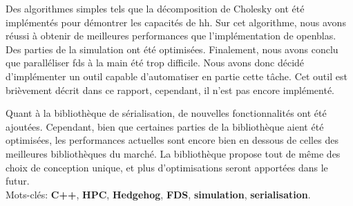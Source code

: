 Des algorithmes simples tels que la décomposition de Cholesky ont été
implémentés pour démontrer les capacités de \gls{hh}. Sur cet algorithme, nous
avons réussi à obtenir de meilleures performances que l'implémentation de
openblas. Des parties de la simulation ont été optimisées. Finalement, nous
avons conclu que paralléliser \gls{fds} à la main été trop difficile. Nous avons
donc décidé d'implémenter un outil capable d'automatiser en partie cette tâche.
Cet outil est brièvement décrit dans ce rapport, cependant, il n'est pas encore
implémenté.

Quant à la bibliothèque de sérialisation, de nouvelles fonctionnalités ont été
ajoutées. Cependant, bien que certaines parties de la bibliothèque aient été
optimisées, les performances actuelles sont encore bien en dessous de celles des
meilleures bibliothèques du marché. La bibliothèque propose tout de même des
choix de conception unique, et plus d'optimisations seront apportées dans le
futur.\\

Mots-clés: \textbf{C++}, \textbf{HPC}, \textbf{Hedgehog}, \textbf{FDS},
\textbf{simulation}, \textbf{serialisation}.
